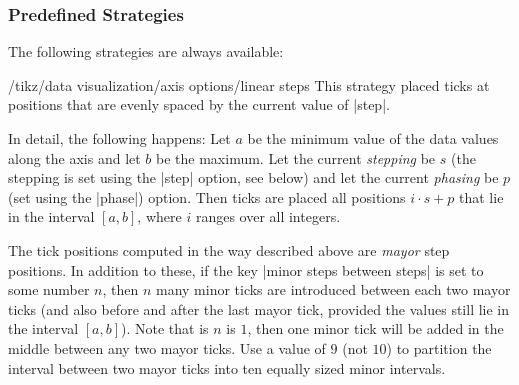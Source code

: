 \subsubsection{Predefined Strategies}

The following strategies are always available:

\begin{key}{/tikz/data visualization/axis options/linear steps}
  This strategy placed ticks at positions that are evenly spaced by
  the current value of |step|.

  In detail, the following happens: Let $a$ be the minimum value of the
  data values along the axis and let $b$ be the maximum. Let the
  current \emph{stepping} be $s$ (the stepping is set using the |step|
  option, see below) and let the current \emph{phasing} be $p$ (set
  using the |phase|) option. Then ticks are placed all positions
  $i\cdot s + p$ that lie in the interval $[a,b]$, where $i$ ranges
  over all integers.

  The tick positions computed in the way described above are
  \emph{mayor} step positions. In addition to these, if the key
  |minor steps between steps| is set to some number $n$, then $n$ many
  minor ticks are introduced between each two mayor ticks (and also
  before and after the last mayor tick, provided the values still lie
  in the interval $[a,b]$). Note that is $n$ is $1$, then one minor tick
  will be added in the middle between any two mayor ticks. Use a value
  of $9$ (not $10$) to partition the interval between two mayor ticks
  into ten equally sized minor intervals.

\begin{codeexample}[]
\end{codeexample}
\end{key}

